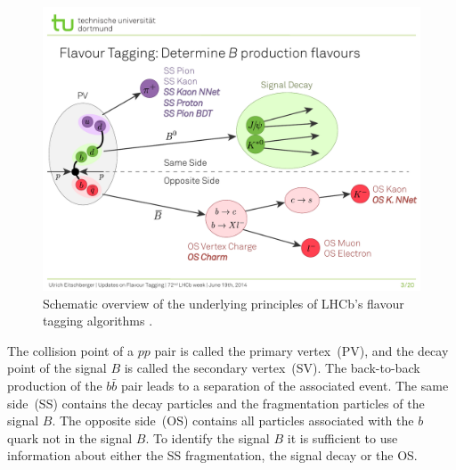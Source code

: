 \begin{figure}
    \centering
    \includegraphics[width=\textwidth]{images/FlavourTaggingScheme.pdf}
    \caption{Schematic overview of the underlying principles of LHCb's flavour tagging algorithms \cite{ft_scheme}.}
    \label{fig:ft_scheme}
\end{figure}

The collision point of a $pp$ pair is called the primary vertex~(PV), and the decay point of the signal $B$ is called the secondary vertex~(SV).
The back-to-back production of the $b\bar{b}$ pair leads to a separation of the associated event.
The same side~(SS) contains the decay particles and the fragmentation particles of the signal $B$.
The opposite side~(OS) contains all particles associated with the $b$ quark not in the signal $B$.
To identify the signal $B$ it is sufficient to use information about either the SS fragmentation, the signal decay or the OS.
